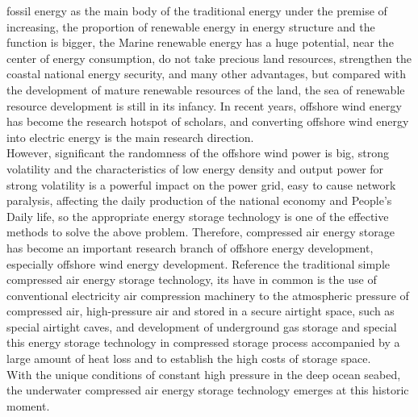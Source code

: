 \documentclass[journal,onecolumn]{IEEEtran}
\begin{document}
 fossil energy as the main body of the traditional energy under the premise of increasing, the proportion of renewable energy in energy structure and the function is bigger, the Marine renewable energy has a huge potential, near the center of energy consumption, do not take precious land resources, strengthen the coastal national energy security, and many other advantages, but compared with the development of mature renewable resources of the land, the sea of renewable resource development is still in its infancy. In recent years, offshore wind energy has become the research hotspot of scholars, and converting offshore wind energy into electric energy is the main research direction. \\

However, significant the randomness of the offshore wind power is big, strong volatility and the characteristics of low energy density and output power for strong volatility is a powerful impact on the power grid, easy to cause network paralysis, affecting the daily production of the national economy and People's Daily life, so the appropriate energy storage technology is one of the effective methods to solve the above problem. Therefore, compressed air energy storage has become an important research branch of offshore energy development, especially offshore wind energy development. Reference the traditional simple compressed air energy storage technology, its have in common is the use of conventional electricity air compression machinery to the atmospheric pressure of compressed air, high-pressure air and stored in a secure airtight space, such as special airtight caves, and development of underground gas storage and special this energy storage technology in compressed storage process accompanied by a large amount of heat loss and to establish the high costs of storage space.\\

With the unique conditions of constant high pressure in the deep ocean seabed, the underwater compressed air energy storage technology emerges at this historic moment. \\
\end{document}
